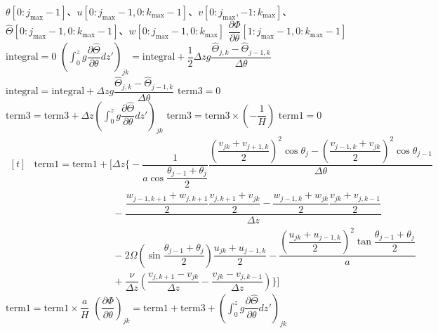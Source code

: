 \documentclass[ja=standard,xelatex]{bxjsarticle}
\newcommand{\vs}[1]{\vskip#1\baselineskip}
\newcommand{\pdif}[2]{\dfrac{\partial{#1}}{\partial#2}}
\newcommand{\dint}{\displaystyle\int}
\newcommand{\bracketnormal}[1]{\left(#1\right)}
\begin{document}
\vs{0.5}

\begin{algorithm}[H]
  \caption*{\textbf{subroutine:} calculate\_partial\_Phi}
  \begin{algorithmic}[1]
    \Require $\theta[0:j_\text{max}-1]$、$u[0:j_\text{max}-1,0:k_\text{max}-1]$、$v[0:j_\text{max},-1:k_\text{max}]$、$\hat{\Theta}[0:j_\text{max}-1,0:k_\text{max}-1]$、$w[0:j_\text{max}-1,0:k_\text{max}]$
    \Ensure $\pdif{\Phi}{\theta}[1:j_\text{max}-1,0:k_\text{max}-1]$
    \Statex
    \State {}
    \State $\text{integral} = 0$
    \State $\bracketnormal{\dint_0^z g\pdif{\hat{\Theta}}{\theta}dz'}_{jk} = \text{integral} + \dfrac{1}{2}\Delta z g\dfrac{\hat{\Theta}_{j,k}-\hat{\Theta}_{j-1,k}}{\Delta \theta}$
    \State $\text{integral}=\text{integral} + \Delta z g\dfrac{\hat{\Theta}_{j,k}-\hat{\Theta}_{j-1,k}}{\Delta \theta}$
    \EndDo
    \State {}
    \State $\text{term3}=0$
    \State $\text{term3} = \text{term3} + \Delta z\bracketnormal{\dint_0^z g\pdif{\hat{\Theta}}{\theta}dz'}_{jk} $
    \EndDo
    \State $\text{term3} = \text{term3}\times\bracketnormal{-\dfrac{1}{H}}$
    \State {}
    \State $\text{term1}=0$
    \State $\begin{aligned}[t]
    &\text{term1} = \text{term1} +\Bigg[\Delta z\Bigg\{-\dfrac{1}{a\cos\dfrac{\theta_{j-1}+\theta_{j}}{2}}\dfrac{\bracketnormal{\dfrac{v_{jk}+v_{j+1,k}}{2}}^2\cos\theta_j - \bracketnormal{\dfrac{v_{j-1,k}+v_{jk}}{2}}^2\cos\theta_{j-1} }{\Delta\theta}\\[5pt]
    &\qquad\qquad\qquad\qquad - \dfrac{\dfrac{w_{j-1,k+1}+w_{j,k+1}}{2}\dfrac{v_{j,k+1}+v_{jk}}{2}-\dfrac{w_{j-1,k}+w_{jk}}{2}\dfrac{v_{jk}+v_{j,k-1}}{2}}{\Delta z}\\[5pt]
    &\qquad\qquad\qquad\qquad-2\Omega\bracketnormal{\sin\dfrac{\theta_{j-1}+\theta_{j}}{2}}\dfrac{u_{jk}+u_{j-1,k}}{2}-\dfrac{\bracketnormal{\dfrac{u_{jk}+u_{j-1,k}}{2}}^2\tan\dfrac{\theta_{j-1}+\theta_{j}}{2}}{a}\\[5pt]
    &\qquad\qquad\qquad\qquad +\dfrac{\nu}{\Delta z}\bracketnormal{\dfrac{v_{j,k+1}-v_{jk}}{\Delta z} - \dfrac{v_{jk}-v_{j,k-1}}{\Delta z}}\Bigg\}\Bigg]
    \end{aligned}$
    \EndDo
    \State $\text{term1} = \text{term1}\times\dfrac{a}{H}$
    \State {}
    \State $\bracketnormal{\pdif{\Phi}{\theta}}_{jk} = \text{term1}+\text{term3} + \bracketnormal{\dint_0^z g\pdif{\hat{\Theta}}{\theta}dz'}_{jk}$
    \EndDo
    \EndDo
  \end{algorithmic}
\end{algorithm}
\end{document}
